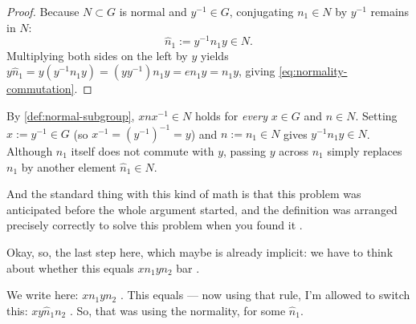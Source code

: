 \begin{proofWrapper}
\begin{content}
\begin{proof}
Because $N \subset G$ is normal and $y^{-1} \in G$, conjugating $n_1 \in N$ by $y^{-1}$ remains in $N$:
\[
\hat{n}_1 := y^{-1} n_1 y \in N.
\]
Multiplying both sides on the left by $y$ yields $y \hat{n}_1 = y (y^{-1} n_1 y) = (y y^{-1}) n_1 y = e n_1 y = n_1 y$, giving \eqref{eq:normality-commutation}.
\end{proof}

\begin{steps}
By \cref{def:normal-subgroup}, $x n x^{-1} \in N$ holds for \emph{every} $x \in G$ and $n \in N$. Setting $x := y^{-1} \in G$ (so $x^{-1} = (y^{-1})^{-1} = y$) and $n := n_1 \in N$ gives $y^{-1} n_1 y \in N$. Although $n_1$ itself does not commute with $y$, passing $y$ across $n_1$ simply replaces $n_1$ by another element $\hat{n}_1 \in N$.
\end{steps}
\end{content}

\begin{hidden}
\end{hidden}

\begin{speech}[01:03:59 - 01:04:30]
And the standard thing with this kind of math is that this problem was anticipated before the whole argument started, and the definition was arranged precisely correctly to solve this problem when you found it .
\end{speech}

\begin{speech}[01:04:30 - 01:06:27]
Okay, so, the last step here, which maybe is already implicit: we have to think about whether this equals $x n_1 y n_2$ bar .

We write here: $x n_1 y n_2$ . This equals --- now using that rule, I'm allowed to switch this: $x y \hat{n}_1 n_2$ . So, that was using the normality, for some $\hat{n}_1$.


\end{speech}
\end{proofWrapper}

